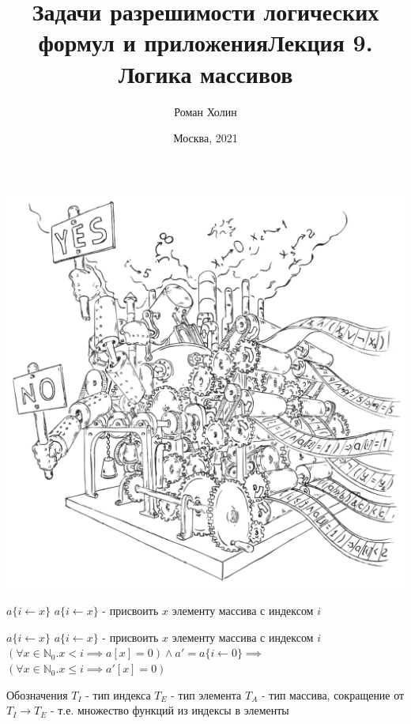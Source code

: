 \documentclass{beamer}
\begin{document}
\title{Задачи разрешимости логических формул и приложения\newline Лекция 9. Логика массивов}
\author{Роман Холин}
\date{Москва, 2021}

\begin{frame}
\includegraphics[scale=0.5]{../decision-procedure.png}
\end{frame}

\frame{\titlepage}

\begin{frame}{$a\{i\leftarrow x\}$}
$a\{i\leftarrow x\}$ - присвоить $x$ элементу массива с индексом $i$\newline
\end{frame}

\begin{frame}{$a\{i\leftarrow x\}$}
$a\{i\leftarrow x\}$ - присвоить $x$ элементу массива с индексом $i$\newline
$(\forall x \in \mathbb{N}_0. x < i \implies a[x] = 0) \wedge a' = a\{i\leftarrow 0\} \implies$\newline
$(\forall x \in \mathbb{N}_0. x \le i \implies a'[x] = 0)$
\end{frame}

\begin{frame}{Обозначения}
$T_I$ - тип индекса\newline
$T_E$ - тип элемента\newline
$T_A$ - тип массива, сокращение от $T_I \rightarrow T_E$ - т.е. множество функций из индексы в элементы\newline
\end{frame}
\end{document}
